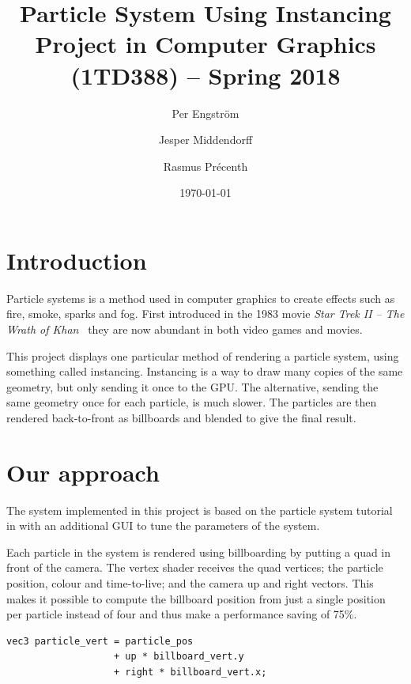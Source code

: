 \documentclass[a4paper, twocolumn, DIV=15]{scrartcl}
\title{\huge Particle System Using Instancing\\
    \normalfont \Large Project in Computer Graphics (1TD388) -- Spring 2018}
\author{Per Engström \and Jesper Middendorff \and Rasmus Précenth}
\date{\today}
\begin{document}
\maketitle

\thispagestyle{empty}

\section{Introduction}
\label{sec:introduction}

Particle systems is a method used in computer graphics to create
effects such as fire, smoke, sparks and fog. First introduced in the
1983 movie \emph{Star Trek II -- The Wrath of Khan}~\cite{reeves1983}
they are now abundant in both video games and movies.

This project displays one particular method of rendering a particle
system, using something called instancing. Instancing is a way to draw
many copies of the same geometry, but only sending it once to the
GPU. The alternative, sending the same geometry once for each
particle, is much slower. The particles are then rendered
back-to-front as billboards and blended to give the final result.

\section{Our approach}
\label{sec:our_approach}

The system implemented in this project is based on the particle system
tutorial in \cite{opengl-tutorial} with an additional GUI to tune the
parameters of the system.

Each particle in the system is rendered using billboarding by putting
a quad in front of the camera. The vertex shader receives the quad
vertices; the particle position, colour and time-to-live; and the
camera up and right vectors. This makes it possible to compute the
billboard position from just a single position per particle instead of
four and thus make a performance saving of 75\%.

\begin{verbatim}
vec3 particle_vert = particle_pos
                   + up * billboard_vert.y
                   + right * billboard_vert.x;
\end{verbatim}
\end{document}
